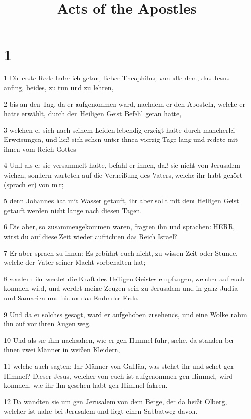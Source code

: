 

\title{Acts of the Apostles}


\chapter{1}

\par 1 Die erste Rede habe ich getan, lieber Theophilus, von alle dem, das Jesus anfing, beides, zu tun und zu lehren,
\par 2 bis an den Tag, da er aufgenommen ward, nachdem er den Aposteln, welche er hatte erwählt, durch den Heiligen Geist Befehl getan hatte,
\par 3 welchen er sich nach seinem Leiden lebendig erzeigt hatte durch mancherlei Erweisungen, und ließ sich sehen unter ihnen vierzig Tage lang und redete mit ihnen vom Reich Gottes.
\par 4 Und als er sie versammelt hatte, befahl er ihnen, daß sie nicht von Jerusalem wichen, sondern warteten auf die Verheißung des Vaters, welche ihr habt gehört (sprach er) von mir;
\par 5 denn Johannes hat mit Wasser getauft, ihr aber sollt mit dem Heiligen Geist getauft werden nicht lange nach diesen Tagen.
\par 6 Die aber, so zusammengekommen waren, fragten ihn und sprachen: HERR, wirst du auf diese Zeit wieder aufrichten das Reich Israel?
\par 7 Er aber sprach zu ihnen: Es gebührt euch nicht, zu wissen Zeit oder Stunde, welche der Vater seiner Macht vorbehalten hat;
\par 8 sondern ihr werdet die Kraft des Heiligen Geistes empfangen, welcher auf euch kommen wird, und werdet meine Zeugen sein zu Jerusalem und in ganz Judäa und Samarien und bis an das Ende der Erde.
\par 9 Und da er solches gesagt, ward er aufgehoben zusehends, und eine Wolke nahm ihn auf vor ihren Augen weg.
\par 10 Und als sie ihm nachsahen, wie er gen Himmel fuhr, siehe, da standen bei ihnen zwei Männer in weißen Kleidern,
\par 11 welche auch sagten: Ihr Männer von Galiläa, was stehet ihr und sehet gen Himmel? Dieser Jesus, welcher von euch ist aufgenommen gen Himmel, wird kommen, wie ihr ihn gesehen habt gen Himmel fahren.
\par 12 Da wandten sie um gen Jerusalem von dem Berge, der da heißt Ölberg, welcher ist nahe bei Jerusalem und liegt einen Sabbatweg davon.
